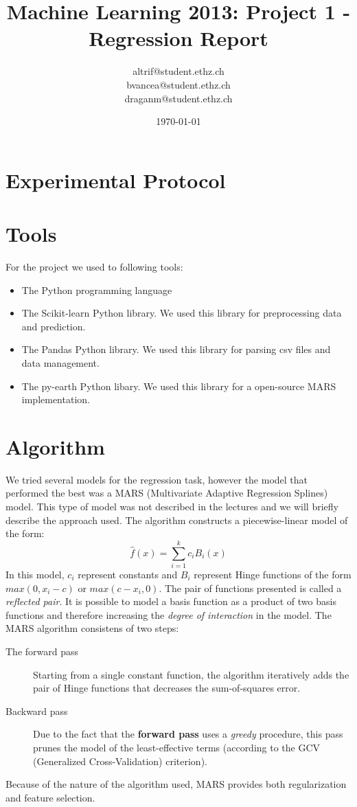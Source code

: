 \documentclass[a4paper, 11pt]{article}
\title{Machine Learning 2013: Project 1 - Regression Report}
\author{altrif@student.ethz.ch\\ bvancea@student.ethz.ch\\ draganm@student.ethz.ch\\}
\date{\today}
\begin{document}
\maketitle

\section*{Experimental Protocol}
\section{Tools}

For the project we used to following tools:
    \begin{itemize}
        \item The Python programming language
        \item The Scikit-learn Python library. We used this library for preprocessing data and prediction.
        \item The Pandas Python library. We used this library for parsing csv files and data management.
        \item The py-earth Python libary. We used this library for a open-source MARS implementation.
    \end{itemize}

\section{Algorithm}
We tried several models for the regression task, however the model that performed the best was a MARS (Multivariate Adaptive Regression Splines) model. This type of model was not described in the lectures and we will briefly describe the approach used. 
The algorithm constructs a piecewise-linear model of the form:
\begin{equation}
    \hat{f}{(x)} = \sum_{i=1}^{k}{c_iB_i(x)}
\end{equation}
In this model, $c_i$ represent constants and $B_i$ represent Hinge functions of the form $max(0,x_i-c)$ or $max(c-x_i,0)$. The pair of functions presented is called a \emph{reflected pair}. It is possible to model a basis function as a product of two basis functions and therefore increasing the \emph{degree of interaction} in the model. The MARS algorithm consistens of two steps:
\begin{description}
\item[The forward pass] Starting from a single constant function, the algorithm iteratively adds the pair of Hinge functions that decreases the sum-of-squares error.
\item[Backward pass] Due to the fact that the \textbf{forward pass} uses a \emph{greedy} procedure, this pass prunes the model of the least-effective terms (according to the GCV (Generalized Cross-Validation) criterion).
\end{description}
Because of the nature of the algorithm used, MARS provides both regularization and feature selection.
\end{document}

